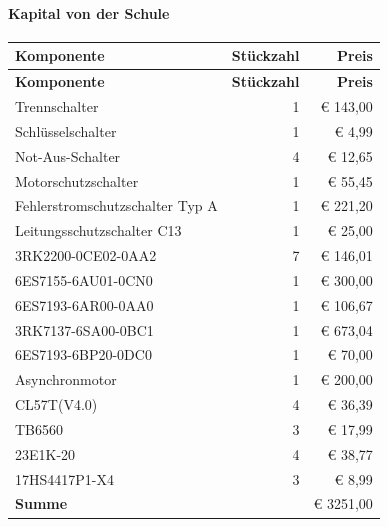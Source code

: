 \paragraph{Kapital von der Schule}
\begin{longtable}{|p{7cm}|r|r|}
    \hline
    \textbf{Komponente} & \textbf{Stückzahl} & \textbf{Preis} \\
    \hline
    \endfirsthead

    \hline
    \textbf{Komponente} & \textbf{Stückzahl} & \textbf{Preis} \\
    \hline
    \endhead

    \hline
    \endfoot

    \hline
    \endlastfoot
    Trennschalter & 1 & € 143,00 \\
    Schlüsselschalter & 1 & € 4,99 \\
    Not-Aus-Schalter & 4 & € 12,65 \\
    Motorschutzschalter & 1 & € 55,45 \\
    Fehlerstromschutzschalter Typ A & 1 & € 221,20 \\
    Leitungsschutzschalter C13 & 1 & € 25,00 \\
    3RK2200-0CE02-0AA2 & 7 & € 146,01 \\
    6ES7155-6AU01-0CN0 & 1 & € 300,00 \\
    6ES7193-6AR00-0AA0 & 1 & € 106,67 \\
    3RK7137-6SA00-0BC1 & 1 & € 673,04 \\
    6ES7193-6BP20-0DC0 & 1 & € 70,00 \\
    Asynchronmotor & 1 & € 200,00 \\
    CL57T(V4.0) & 4 & € 36,39 \\
    TB6560 & 3 & € 17,99 \\
    23E1K-20 & 4 & € 38,77 \\
    17HS4417P1-X4 & 3 & € 8,99 \\
    \textbf{Summe} & & € 3251,00\\
    \hline
    \hline
\end{longtable}
